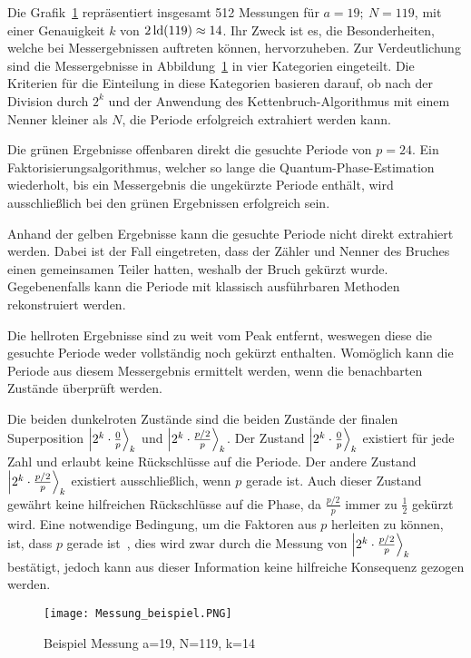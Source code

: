 \bigskip

Die Grafik~\ref{fig:shor_measure} repräsentiert insgesamt 512 Messungen für \(a=19;~N=119\), 
mit einer Genauigkeit \(k\) von \(2\operatorname{ld}(119) \approx 14 \). 
Ihr Zweck ist es, die Besonderheiten, 
welche bei Messergebnissen auftreten können, hervorzuheben.
Zur Verdeutlichung sind die Messergebnisse in Abbildung~\ref{fig:shor_measure} in vier Kategorien eingeteilt.
Die Kriterien für die Einteilung in diese Kategorien basieren darauf, 
ob nach der Division durch \(2^k\) und 
der Anwendung des Kettenbruch-Algorithmus mit einem Nenner kleiner als \(N\), 
die Periode erfolgreich extrahiert werden kann.

Die grünen Ergebnisse offenbaren direkt die gesuchte Periode von \(p = 24\).
Ein Faktorisierungsalgorithmus, welcher so lange die Quantum-Phase-Estimation wiederholt, 
bis ein Messergebnis die ungekürzte Periode enthält, 
wird ausschließlich bei den grünen Ergebnissen erfolgreich sein.

Anhand der gelben Ergebnisse kann die gesuchte Periode nicht direkt extrahiert werden.
Dabei ist der Fall eingetreten, dass der Zähler und Nenner des Bruches einen gemeinsamen Teiler hatten, 
weshalb der Bruch gekürzt wurde.
Gegebenenfalls kann die Periode mit klassisch ausführbaren Methoden rekonstruiert werden.

Die hellroten Ergebnisse sind zu weit vom Peak entfernt,
weswegen diese die gesuchte Periode weder vollständig noch gekürzt enthalten.
Womöglich kann die Periode aus diesem Messergebnis ermittelt werden, 
wenn die benachbarten Zustände überprüft werden.

Die beiden dunkelroten Zustände sind die beiden Zustände der finalen Superposition
\(\ket{2^k \cdot \frac{0}{p}}_k\) und \(\ket{2^k \cdot \frac{p/2}{p}}_k\).
Der Zustand \(\ket{2^k \cdot \frac{0}{p}}_k\) existiert für jede Zahl und erlaubt keine 
Rückschlüsse auf die Periode.
Der andere Zustand \(\ket{2^k \cdot \frac{p/2}{p}}_k\) existiert ausschließlich, wenn \(p\) gerade ist.
Auch dieser Zustand gewährt keine hilfreichen Rückschlüsse auf die Phase, 
da \(\frac{p/2}{p}\) immer zu \(\frac{1}{2}\) gekürzt wird.
Eine notwendige Bedingung, um die Faktoren aus \(p\) herleiten zu können, 
ist, dass \(p\) gerade ist~\cite*{Shor_1997}, 
dies wird zwar durch die Messung von \(\ket{2^k \cdot \frac{p/2}{p}}_k\) bestätigt, 
jedoch kann aus dieser Information keine hilfreiche Konsequenz gezogen werden.

\begin{figure}[H]
  \centering
  \texttt{[image: Messung\_beispiel.PNG]}
  \caption{Beispiel Messung a=19, N=119, k=14}
  \label{fig:shor_measure}
\end{figure}


